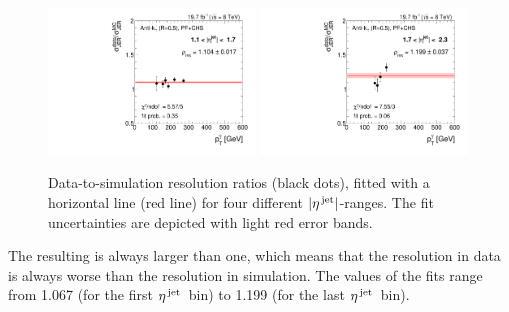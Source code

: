 \begin{figure}[!t]
    \includegraphics[width=0.49\textwidth]{figures/resolution/results/Ratio_Resolution_for_3_eta_bin_PFCHS_data_comparison_RMS99.pdf}
    \includegraphics[width=0.49\textwidth]{figures/resolution/results/Ratio_Resolution_for_4_eta_bin_PFCHS_data_comparison_RMS99.pdf}
  \caption{Data-to-simulation resolution ratios \rhores (black dots), fitted with a horizontal line (red line) for four different $|{\eta}^{\text{\,jet}}|$-ranges.
           The fit uncertainties are depicted with light red error bands.}
  \label{res:fig:RatioEtaBinned}
\end{figure}

The resulting \rhores is always larger than one, which means that the resolution in data is always worse than the resolution in simulation.
The values of the fits range from 1.067 (for the first ${\eta}^{\text{\,jet}}$~bin) to 1.199 (for the last ${\eta}^{\text{\,jet}}$~bin). 

